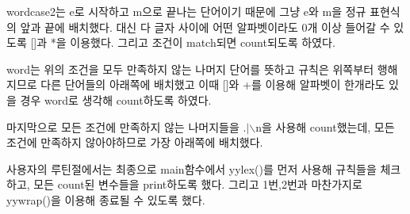 \documentclass{article}
\begin{document}
wordcase2는 e로 시작하고 m으로 끝나는 단어이기 때문에 그냥 e와 m을 정규 표현식의 앞과 끝에 배치했다. 대신 다 글자 사이에 어떤 알파벳이라도 0개 이상 들어갈 수 있도록 []과 *을 이용했다. 그리고 조건이 match되면 count되도록 하였다.

word는 위의 조건을 모두 만족하지 않는 나머지 단어를 뜻하고 규칙은 위쪽부터 행해지므로 다른 단어들의 아래쪽에 배치했고 이때 []와 +를 이용해 알파벳이 한개라도 있을 경우 word로 생각해 count하도록 하였다.

마지막으로 모든 조건에 만족하지 않는 나머지들을 .$\vert$$\backslash$n을 사용해 count했는데, 모든 조건에 만족하지 않아야하므로 가장 아래쪽에 배치했다.

사용자의 루틴절에서는 최종으로 main함수에서 yylex()를 먼저 사용해 규칙들을 체크하고, 모든 count된 변수들을 print하도록 했다. 그리고 1번,2번과 마찬가지로 yywrap()을 이용해 종료될 수 있도록 했다.
\end{document}
